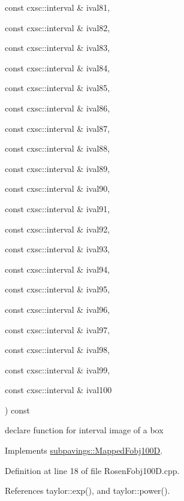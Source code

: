 {{\begin{DoxyParamCaption}
\item[{const cxsc\-::interval \&}]{ival81, }
\item[{const cxsc\-::interval \&}]{ival82, }
\item[{const cxsc\-::interval \&}]{ival83, }
\item[{const cxsc\-::interval \&}]{ival84, }
\item[{const cxsc\-::interval \&}]{ival85, }
\item[{const cxsc\-::interval \&}]{ival86, }
\item[{const cxsc\-::interval \&}]{ival87, }
\item[{const cxsc\-::interval \&}]{ival88, }
\item[{const cxsc\-::interval \&}]{ival89, }
\item[{const cxsc\-::interval \&}]{ival90, }
\item[{const cxsc\-::interval \&}]{ival91, }
\item[{const cxsc\-::interval \&}]{ival92, }
\item[{const cxsc\-::interval \&}]{ival93, }
\item[{const cxsc\-::interval \&}]{ival94, }
\item[{const cxsc\-::interval \&}]{ival95, }
\item[{const cxsc\-::interval \&}]{ival96, }
\item[{const cxsc\-::interval \&}]{ival97, }
\item[{const cxsc\-::interval \&}]{ival98, }
\item[{const cxsc\-::interval \&}]{ival99, }
\item[{const cxsc\-::interval \&}]{ival100}
\end{DoxyParamCaption}
) const}}\label{classRosenFobj100D_a6129ba2da54c28e00c0d41284a732af3}


declare function for interval image of a box 



\-Implements \hyperlink{classsubpavings_1_1MappedFobj100D_a6439390e913abd6ccf9626eaa1dacd16}{subpavings\-::\-Mapped\-Fobj100\-D}.



\-Definition at line 18 of file \-Rosen\-Fobj100\-D.\-cpp.



\-References taylor\-::exp(), and taylor\-::power().


